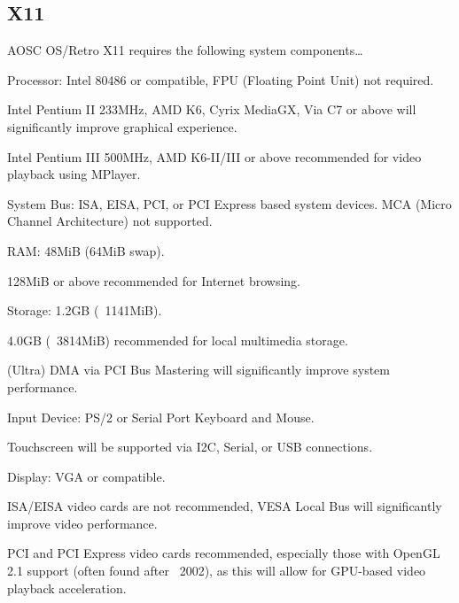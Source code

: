 \documentclass[a5paper,twosided,11pt]{book}
\begin{document}
    \subsection{X11}

    AOSC OS/Retro X11 requires the following system components\ldots

    \begin{compactitem}
    \item Processor: Intel 80486 or compatible, FPU (Floating Point Unit) not required.
        \begin{compactitem}
            \item Intel Pentium II 233MHz, AMD K6, Cyrix MediaGX, Via C7 or above will significantly improve graphical experience.
            \item Intel Pentium III 500MHz, AMD K6-II/III or above recommended for video playback using MPlayer.
        \end{compactitem}
    \item System Bus: ISA, EISA, PCI, or PCI Express based system devices. MCA (Micro Channel Architecture) not supported.
    \item RAM: 48MiB (64MiB swap).
        \begin{compactitem}
            \item 128MiB or above recommended for Internet browsing.
        \end{compactitem}
    \item Storage: 1.2GB (~1141MiB).
        \begin{compactitem}
            \item 4.0GB (~3814MiB) recommended for local multimedia storage.
            \item (Ultra) DMA via PCI Bus Mastering will significantly improve system performance.
        \end{compactitem}
    \item Input Device: PS/2 or Serial Port Keyboard and Mouse.
        \begin{compactitem}
            \item Touchscreen will be supported via I2C, Serial, or USB connections.
        \end{compactitem}
    \item Display: VGA or compatible.
        \begin{compactitem}
            \item ISA/EISA video cards are not recommended, VESA Local Bus will significantly improve video performance.
            \item PCI and PCI Express video cards recommended, especially those with OpenGL 2.1 support (often found after ~2002), as this will allow for GPU-based video playback acceleration.
        \end{compactitem}
    \end{compactitem}
\end{document}
